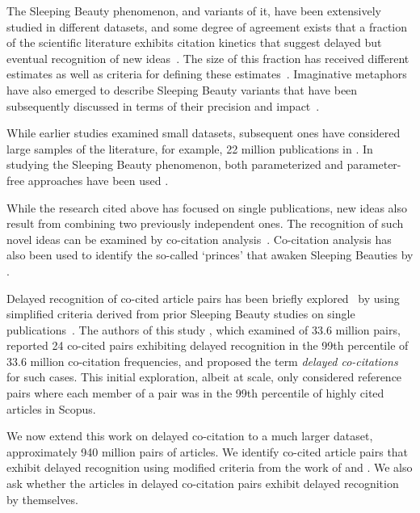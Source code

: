\documentclass[utf8]{frontiersSCNS}
\begin{document}
The Sleeping Beauty phenomenon, and variants of it, have been extensively studied in different datasets, and some degree of agreement exists that a fraction of the scientific literature exhibits citation kinetics that suggest delayed but eventual recognition of new ideas~\citep{Glanzel2003,redner_2005,Braun_2010,Li2014}. The size of this fraction has received different estimates as well as criteria for defining these estimates~\citep{Glanzel2004,Ke2015,Li2016,Raan2019}. Imaginative metaphors have also emerged to describe Sleeping Beauty variants that have been subsequently discussed in terms of their precision and impact~\citep{sugimoto_mostafa_2018}. 


While earlier studies examined small datasets, subsequent ones have considered large samples of the literature, for example, 22 million publications in \cite{Ke2015}. In studying the Sleeping Beauty phenomenon, both parameterized and parameter-free approaches have been used \citep{Raan2004, li_2014,Ke2015,costas2010,ye_bornmann_2018}. 

While the research cited above has focused on single publications, new ideas also result from combining two previously independent ones. The recognition of such novel ideas can be examined by co-citation analysis~\citep{MarshakovaShaikevich1973,Uzzi2013,Boyack2014,Wang2017,Bradley2020}.  Co-citation analysis has also been used to identify the so-called `princes' that awaken Sleeping Beauties by \citep{zong_2018,teixeira2017sleeping} . 

Delayed recognition of co-cited article pairs has been briefly explored~\citep{devarakonda_2020} by using simplified criteria derived from prior Sleeping Beauty studies on single publications~\citep{Ke2015,Raan2004,Raan2019}. 
The authors of this study \citep{devarakonda_2020}, which examined of 33.6 million pairs, reported 24 co-cited pairs exhibiting delayed recognition in the 99th percentile of 33.6 million co-citation frequencies, and proposed the term \emph{delayed co-citations} for such cases. This initial exploration, albeit at scale, only considered reference pairs where each member of a pair was in the 99th percentile of highly cited articles in Scopus. 

We now extend this work on delayed co-citation to a much larger dataset, approximately 940 million pairs of articles. We identify co-cited article pairs that exhibit delayed recognition using modified criteria from the work of  \cite{Raan2004,Raan2019} and  \cite{Ke2015}. We also ask whether the articles in delayed co-citation pairs exhibit delayed recognition by themselves.
\end{document}
